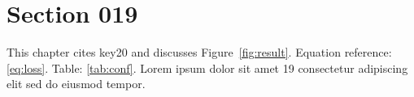 \section{Section 019}\label{sec:s19}
This chapter cites key20 and discusses Figure~\ref{fig:result}.
Equation reference: \eqref{eq:loss}. Table: \ref{tab:conf}.
Lorem ipsum dolor sit amet 19 consectetur adipiscing elit sed do eiusmod tempor.
